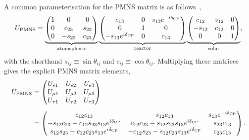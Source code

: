 A common parameterisation for the PMNS matrix is as follows~\cite{PDG2024},
\begin{equation}
    U_{\rm PMNS} =
    \underbrace{\begin{pmatrix}
        1 & 0 & 0 \\
        0 & c_{23} & s_{23} \\
        0 & -s_{23} & c_{23}
    \end{pmatrix}}_{\text{atmospheric}}
    \underbrace{\begin{pmatrix}
        c_{13} & 0 & s_{13}e^{-i\delta_{\rm CP}} \\
        0 & 1 & 0 \\
        -s_{13}e^{i\delta_{\rm CP}} & 0 & c_{13}
    \end{pmatrix}}_{\text{reactor}}
    \underbrace{\begin{pmatrix}
        c_{12} & s_{12} & 0 \\
        -s_{12} & c_{12} & 0 \\
        0 & 0 & 1
    \end{pmatrix}}_{\text{solar}}
    ,
    \label{eq:pmns}
\end{equation}
with the shorthand $s_{ij} \equiv \sin\theta_{ij}$ and $c_{ij} \equiv \cos\theta_{ij}$.
Multiplying these matrices gives the explicit PMNS matrix elements,
\begin{equation}
    \begin{aligned}
    U_{\rm PMNS}
    &=
    \begin{pmatrix}
        U_{e1} & U_{e2} & U_{e3} \\
        U_{\mu 1} & U_{\mu 2} & U_{\mu 3} \\
        U_{\tau 1} & U_{\tau 2} & U_{\tau 3}
    \end{pmatrix}
    \\[0.5em]
    &=
    \begin{pmatrix}
        c_{12}c_{13}
        & s_{12}c_{13}
        & s_{13}e^{-i\delta_{\rm CP}} \\
        -s_{12}c_{23}-c_{12}s_{23}s_{13}e^{i\delta_{\rm CP}}
        & c_{12}c_{23}-s_{12}s_{23}s_{13}e^{i\delta_{\rm CP}}
        & s_{23}c_{13} \\
        s_{12}s_{23}-c_{12}c_{23}s_{13}e^{i\delta_{\rm CP}}
        & -c_{12}s_{23}-s_{12}c_{23}s_{13}e^{i\delta_{\rm CP}}
        & c_{23}c_{13}
    \end{pmatrix}.
    \end{aligned}
    \label{eq:pmns-elements}
\end{equation}
